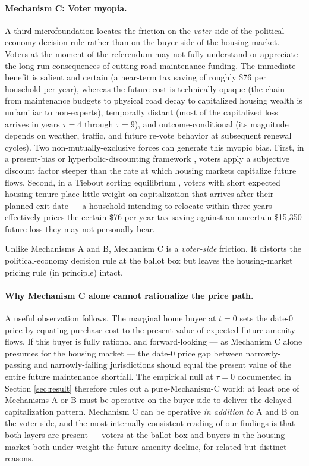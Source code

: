 \paragraph{Mechanism C: Voter myopia.}
A third microfoundation locates the friction on the {\it voter} side of the political-economy decision rule rather than on the buyer side of the housing market. Voters at the moment of the referendum may not fully understand or appreciate the long-run consequences of cutting road-maintenance funding. The immediate benefit is salient and certain (a near-term tax saving of roughly \$76 per household per year), whereas the future cost is technically opaque (the chain from maintenance budgets to physical road decay to capitalized housing wealth is unfamiliar to non-experts), temporally distant (most of the capitalized loss arrives in years $\tau = 4$ through $\tau = 9$), and outcome-conditional (its magnitude depends on weather, traffic, and future re-vote behavior at subsequent renewal cycles). Two non-mutually-exclusive forces can generate this myopic bias. First, in a present-bias or hyperbolic-discounting framework \citep{laibson1997golden}, voters apply a subjective discount factor steeper than the rate at which housing markets capitalize future flows. Second, in a Tiebout sorting equilibrium \citep{Tiebout1956}, voters with short expected housing tenure place little weight on capitalization that arrives after their planned exit date --- a household intending to relocate within three years effectively prices the certain \$76 per year tax saving against an uncertain \$15{,}350 future loss they may not personally bear.

Unlike Mechanisms A and B, Mechanism C is a {\it voter-side} friction. It distorts the political-economy decision rule at the ballot box but leaves the housing-market pricing rule (in principle) intact.

\paragraph{Why Mechanism C alone cannot rationalize the price path.}
A useful observation follows. The marginal home buyer at $t = 0$ sets the date-$0$ price by equating purchase cost to the present value of expected future amenity flows. If this buyer is fully rational and forward-looking --- as Mechanism C alone presumes for the housing market --- the date-$0$ price gap between narrowly-passing and narrowly-failing jurisdictions should equal the present value of the entire future maintenance shortfall. The empirical null at $\tau = 0$ documented in Section \ref{sec:result} therefore rules out a pure-Mechanism-C world: at least one of Mechanisms A or B must be operative on the buyer side to deliver the delayed-capitalization pattern. Mechanism C can be operative {\it in addition to} A and B on the voter side, and the most internally-consistent reading of our findings is that both layers are present --- voters at the ballot box and buyers in the housing market both under-weight the future amenity decline, for related but distinct reasons.

